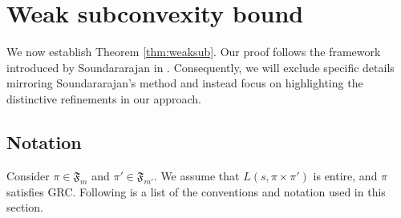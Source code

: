 \documentclass[12pt,reqno]{amsart}
\theoremstyle{remark}
\numberwithin{equation}{section}
\begin{document}
    
	\section{Weak subconvexity bound}\label{sec:weak-subconvexity-bound}

    We now establish Theorem \ref{thm:weaksub}. Our proof follows the framework introduced by Soundararajan in \cite{S}. Consequently, we will exclude specific details mirroring Soundararajan's method and instead focus on highlighting the distinctive refinements in our approach. 
	\subsection{Notation}\label{subsec: notation} 
    Consider $\pi \in \mathfrak{F}_m$ and $\pi'\in \mathfrak{F}_{m'}$. We assume that $L(s, \pi \times \pi')$ is entire, and $\pi$ satisfies GRC.  Following is a list of the conventions and notation used in this section.
\end{document}
